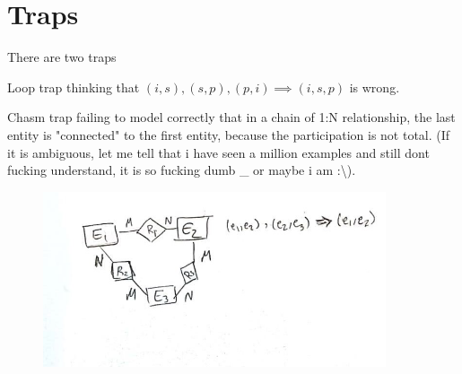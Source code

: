 \section{Traps}
There are two traps 
\begin{definition}
    \item [Loop trap] thinking that \((i,s), (s,p) , (p,i) \implies (i,s,p)\) is wrong.
    \item [Chasm trap] failing to model correctly that in a chain of 1:N relationship, the last entity is "connected" to the first entity, because the participation is not total. (If it is ambiguous, let me tell that i have seen a million examples and still dont fucking understand, it is so fucking dumb \_ or maybe i am :\textbackslash).
\end{definition}
\begin{figure}
    \centering
    \includegraphics[width = 0.9\textwidth]{Graphics/looptrap.jpg}
\end{figure}